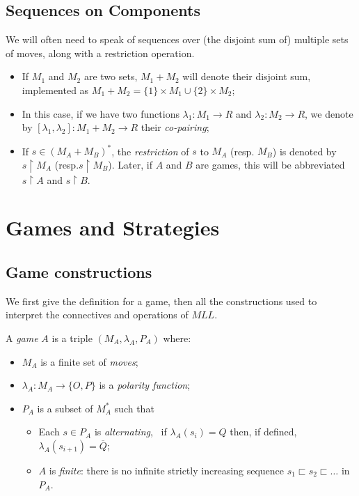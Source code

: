 \subsection{Sequences on Components}\label{sequences-on-components}

We will often need to speak of sequences over (the disjoint sum of)
multiple sets of moves, along with a restriction operation.

\begin{itemize}
\item If \(M_1\) and \(M_2\) are two sets, \(M_1 + M_2\) will denote their
  disjoint sum, implemented as
  \(M_1 + M_2 = \{1\}\times M_1 \cup \{2\}\times M_2\);
\item In this case, if we have two functions \(\lambda_1:M_1 \to R\) and
  \(\lambda_2:M_2\to R\), we denote by
  \([\lambda_1,\lambda_2]:M_1 + M_2 \to R\) their \emph{co-pairing};
\item If \(s\in (M_A + M_B)^*\), the \emph{restriction} of \(s\) to
  \(M_A\) (resp. \(M_B\)) is denoted by \(s\upharpoonright M_A\)
  (resp.\(s \upharpoonright M_B\)). Later, if \(A\) and \(B\) are games,
  this will be abbreviated \(s\upharpoonright A\) and
  \(s\upharpoonright B\).
\end{itemize}

\section{Games and Strategies}\label{games-and-strategies}

\subsection{Game constructions}\label{game-constructions}

We first give the definition for a game, then all the constructions used
to interpret the connectives and operations of \(MLL\).

\begin{definition}[Games]
A \emph{game} $ A$ is a triple $(M_A,\lambda_A,P_A)$ where:
\begin{itemize}
\item $M_A$ is a finite set of \emph{moves};
\item $\lambda_A: M_A \to \{O,P\}$ is a \emph{polarity function};
\item $P_A$ is a subset of $M_A^*$ such that
  \begin{itemize}
  \item Each $s\in P_A$ is \emph{alternating}, \ie\ if $\lambda_A (s_i) = Q$ then, if defined, $\lambda_A(s_{i+1}) = \overline{Q}$;
  \item $A$ is \emph{finite}: there is no infinite strictly increasing sequence $s_1 \sqsubset s_2 \sqsubset \dots $ in $P_A$.
  \end{itemize}
\end{itemize}
\end{definition}

